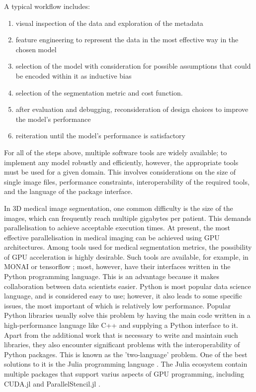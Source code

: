 \documentclass{juliacon}
\begin{document}
A typical workflow includes:
\begin{enumerate}
  \item visual inspection of  the data and exploration of the metadata
  \item feature engineering to represent the data in the most effective way in the chosen model
  \item selection of the model with consideration for possible assumptions that could be encoded within it as inductive bias
  \item selection of the segmentation metric and cost function.
  \item after evaluation and debugging, reconsideration of  design choices to improve the model's performance
  \item reiteration until the model's performance is satisfactory
\end{enumerate}

For all of the steps above, multiple software tools are widely available; to implement any model robustly and efficiently, however, the appropriate tools must be used for a given domain. This involves considerations on the size of single image files, performance constraints, interoperability of the required tools, and the language of the package interface.

In 3D medical image segmentation, one common difficulty is the size of the images, which can frequently reach multiple gigabytes per patient. This demands parallelisation to achieve acceptable execution times. At present, the most effective parallelisation in medical imaging can be achieved using GPU architectures. Among tools used for medical segmentation metrics, the possibility of GPU acceleration is highly desirable. Such tools are available, for example, in MONAI \cite{MONAI} or tensorflow \cite{tensorflow}; most, however, have their interfaces written in the Python programming language. This is an advantage because it makes collaboration between data scientists easier. Python is most popular data science language, and is considered easy to use; however, it also leads to some specific issues, the most important of which is relatively low performance. Popular Python libraries usually solve this problem by having the main code written in a high-performance language like C++ and supplying a Python interface to it. Apart from the additional work that is necessary to write and maintain such libraries, they also encounter significant problems with the interoperability of Python packages. This is known as the 'two-language' problem. One of the best solutions to it is the Julia programming language \cite{Julia}. The Julia ecosystem contain multiple packages that support varius aspects of GPU programming, including CUDA.jl \cite{besard2019prototyping} and ParallelStencil.jl \cite{ParallelStencil}.
\end{document}
